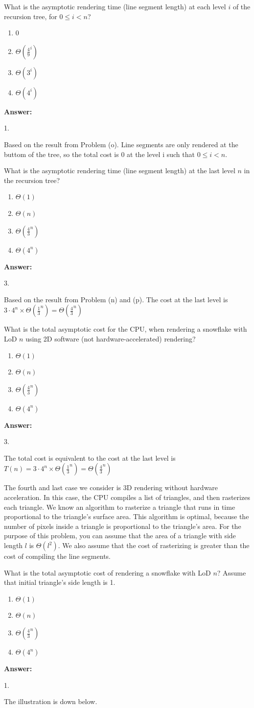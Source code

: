 \documentclass[12pt,twoside]{article}
\newcommand{\answer}{
 \par\medskip
 \textbf{Answer:}
}
\newcommand{\answerIq}{ \answer
{\color{blue}1.

Based on the result from Problem (o). Line segments are only rendered 
at the buttom of the tree, so the total cost is 0 at the 
level i such that $0 \le i < n$.}
}
\newcommand{\answerIr}{ \answer
{\color{blue}3.

Based on the result from Problem (n) and (p). The cost at the last level is 
$ 3 \cdot 4^n \times \Theta(\frac{1}{3}^n) = \Theta (\frac{4}{3}^n) $}
}
\newcommand{\answerIs}{ \answer
{\color{blue}3.

The total cost is equivalent to the cost at the last level is 
$ T(n) = 3 \cdot 4^n \times \Theta(\frac{1}{3}^n) = \Theta (\frac{4}{3}^n) $}
}
\newcommand{\answerIt}{ \answer
{\color{blue}1.

The illustration is down below.}
}
\begin{document}
\begin{problems}
\begin{problemparts}
  \problempart {} What is the asymptotic rendering time (line segment length)
  at each level $i$ of the recursion tree, for $0 \le i < n$?
    \begin{enumerate}
      \item 0
      \item $\Theta(\frac{4}{9} ^ i)$
      \item $\Theta(3 ^ i)$
      \item $\Theta(4 ^ i)$
    \end{enumerate}
\answerIq

  \problempart {} What is the asymptotic rendering time (line segment length)
  at the last level $n$ in the recursion tree?
    \begin{enumerate}
      \item $\Theta(1)$
      \item $\Theta(n)$
      \item $\Theta(\frac{4}{3}^n)$
      \item $\Theta(4^n)$
    \end{enumerate}
\answerIr

  \problempart {} What is the total asymptotic cost for the CPU, when rendering
  a snowflake with LoD $n$ using 2D software (not hardware-accelerated)
  rendering?
   \begin{enumerate}
      \item $\Theta(1)$
      \item $\Theta(n)$
      \item $\Theta(\frac{4}{3}^n)$
      \item $\Theta(4^n)$
    \end{enumerate}
\answerIs

\end{problemparts}

The fourth and last case we consider is 3D rendering without hardware
acceleration. In this case, the CPU compiles a list of triangles, and then
rasterizes each triangle. We know an algorithm to rasterize a triangle that
runs in time proportional to the triangle's surface area. This algorithm is
optimal, because the number of pixels inside a triangle is proportional to the
triangle's area. For the purpose of this problem, you can assume that the area
of a triangle with side length $l$ is $\Theta(l^2)$. We also assume that the
cost of rasterizing is greater than the cost of compiling the line segments.

\begin{problemparts}
  \problempart {} What is the total asymptotic cost of rendering a snowflake
  with LoD $n$? Assume that initial triangle's side length is 1.
    \begin{enumerate}
      \item $\Theta(1)$
      \item $\Theta(n)$
      \item $\Theta(\frac{4}{3}^n)$
      \item $\Theta(4^n)$
    \end{enumerate}
\answerIt
    

\end{problemparts}
\end{problems}
\end{document}
